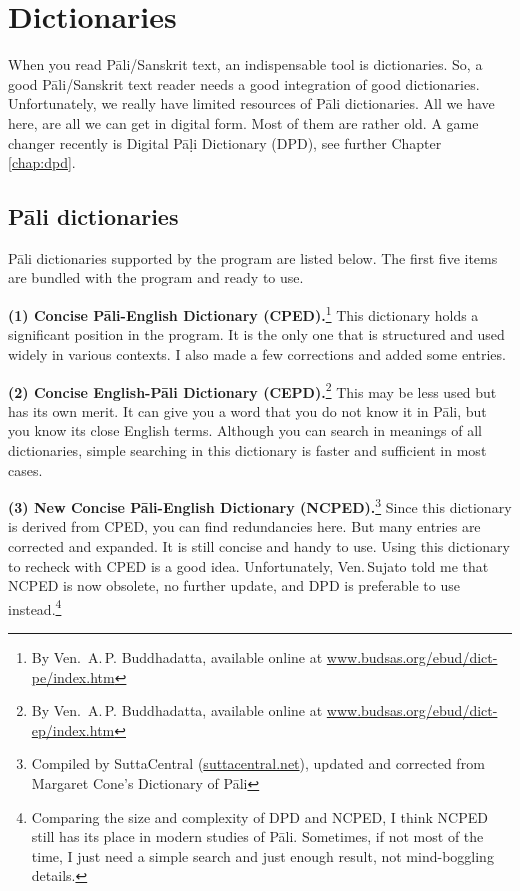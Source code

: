 \chapter{Dictionaries}\label{chap:dict}

When you read Pāli/Sanskrit text, an indispensable tool is dictionaries. So, a good Pāli/Sanskrit text reader needs a good integration of good dictionaries. Unfortunately, we really have limited resources of Pāli dictionaries. All we have here, are all we can get in digital form. Most of them are rather old. A game changer recently is Digital Pāḷi Dictionary (DPD), see further Chapter \ref{chap:dpd}.

\section{Pāli dictionaries}

Pāli dictionaries supported by the program are listed below. The first five items are bundled with the program and ready to use.

\textbf{(1) Concise Pāli-English Dictionary (CPED).}\footnote{By Ven.\ A.\,P. Buddhadatta, available online at \url{www.budsas.org/ebud/dict-pe/index.htm}} This dictionary holds a significant position in the program. It is the only one that is structured and used widely in various contexts. I also made a few corrections and added some entries.

\textbf{(2) Concise English-Pāli Dictionary (CEPD).}\footnote{By Ven.\ A.\,P. Buddhadatta, available online at \url{www.budsas.org/ebud/dict-ep/index.htm}} This may be less used but has its own merit. It can give you a word that you do not know it in Pāli, but you know its close English terms. Although you can search in meanings of all dictionaries, simple searching in this dictionary is faster and sufficient in most cases.

\textbf{(3) New Concise Pāli-English Dictionary (NCPED).}\footnote{Compiled by SuttaCentral (\url{suttacentral.net}), updated and corrected from Margaret Cone's Dictionary of Pāli} Since this dictionary is derived from CPED, you can find redundancies here. But many entries are corrected and expanded. It is still concise and handy to use. Using this dictionary to recheck with CPED is a good idea. Unfortunately, Ven.\,Sujato told me that NCPED is now obsolete, no further update, and DPD is preferable to use instead.\footnote{Comparing the size and complexity of DPD and NCPED, I think NCPED still has its place in modern studies of Pāli. Sometimes, if not most of the time, I just need a simple search and just enough result, not mind-boggling details.}


